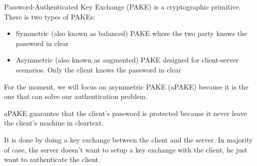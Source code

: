 \documentclass[../report.tex]{subfiles}
\begin{document}




Password-Authenticated Key Exchange (PAKE) is a cryptographic primitive. There is two types of PAKEs: 

\begin{itemize}
 \item Symmetric (also known as balanced) PAKE where the two party knows the password in clear
 \item Asymmetric (also known as augmented) PAKE designed for client-server scenarios. Only the client knows the password in clear
\end{itemize}

For the moment, we will focus on asymmetric PAKE (aPAKE) because it is the one that can solve our authentication problem.

aPAKE guarantee that the client's password is protected because it never leave the client's machine in cleartext.


It is done by doing a key exchange between the client and the server.
In majority of case, the server doesn't want to setup a key exchange with the client, he just want to authenticate the client.
\end{document}
